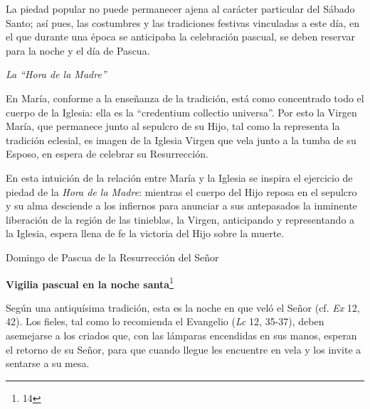 			\begin{bodyintro}La piedad popular no puede permanecer ajena al carácter particular del Sábado Santo; así pues, las costumbres y las tradiciones festivas vinculadas a este día, en el que durante una época se anticipaba la celebración pascual, se deben reservar para la noche y el día de Pascua.\end{bodyintro}
			
			\begin{bodyintro}\textit{La “Hora de la Madre”}\end{bodyintro}
			
			\begin{bodyintro}En María, conforme a la enseñanza de la tradición, está como concentrado todo el cuerpo de la Iglesia: ella es la “credentium collectio universa”. Por esto la Virgen María, que permanece junto al sepulcro de su Hijo, tal como la representa la tradición eclesial, es imagen de la Iglesia Virgen que vela junto a la tumba de su Esposo, en espera de celebrar su Resurrección.\end{bodyintro}
			
			\begin{bodyintro}En esta intuición de la relación entre María y la Iglesia se inspira el ejercicio de piedad de la \textit{Hora de la Madre}: mientras el cuerpo del Hijo reposa en el sepulcro y su alma desciende a los infiernos para anunciar a sus antepasados la inminente liberación de la región de las tinieblas, la Virgen, anticipando y representando a la Iglesia, espera llena de fe la victoria del Hijo sobre la muerte.\end{bodyintro}
			
			\begin{bodyintro} \end{bodyintro}
			
			\begin{bodyintro}\begin{introsubsection}Domingo de Pascua de la Resurrección del Señor\end{introsubsection} \end{bodyintro}
			
			\begin{bodyintro}\textbf{Vigilia pascual en la noche santa}\footnote{14}\end{bodyintro}
			
			\begin{bodyintro}Según una antiquísima tradición, esta es la noche en que veló el Señor (cf. \textit{Ex} 12, 42). Los fieles, tal como lo recomienda el Evangelio (\textit{Lc }12, 35-37), deben asemejarse a los criados que, con las lámparas encendidas en sus manos, esperan el retorno de su Señor, para que cuando llegue les encuentre en vela y los invite a sentarse a su mesa.\end{bodyintro}
			
